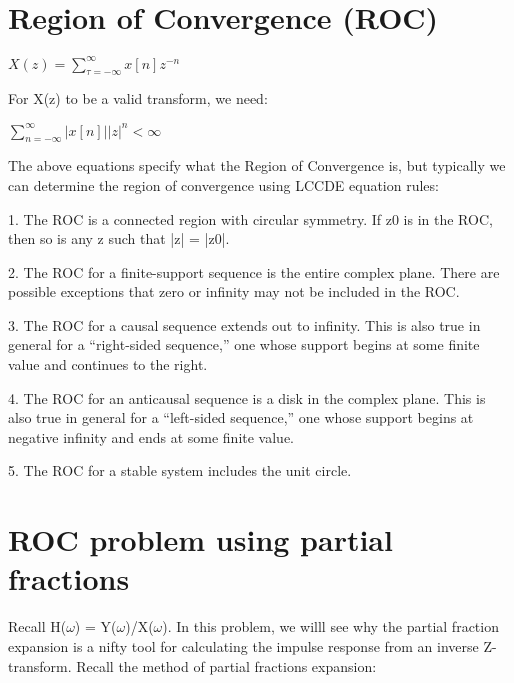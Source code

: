 \documentclass[11pt]{article}
\begin{document}
\vspace{3mm}

\section{Region of Convergence (ROC)}
\begin{center}
$
X(z) = \sum_{\tau  = -\infty}^{\infty} x[n] z^{-n}
$
\end{center}

\vspace{2mm}

For X(z) to be a valid transform, we need:
\vspace{2mm}
\begin{center}
$
\sum_{n = -\infty}^{\infty} |x[n]||z|^{n} < \infty
$
\end{center}

\vspace{2mm}

The above equations specify what the Region of Convergence is, but typically we can determine the region of convergence using LCCDE equation rules:\newline

\begin{center}

1. The ROC is a connected region with circular symmetry. If z0 is in the ROC,
then so is any z such that |z| = |z0|.

2. The ROC for a finite-support sequence is the entire complex plane. There
are possible exceptions that zero or infinity may not be included in the ROC.


3. The ROC for a causal sequence extends out to infinity. This is also true in
general for a “right-sided sequence,” one whose support begins at some finite
value and continues to the right.

4. The ROC for an anticausal sequence is a disk in the complex plane. This is
also true in general for a “left-sided sequence,” one whose support begins at
negative infinity and ends at some finite value.

5. The ROC for a stable system includes the unit circle.

\end{center}

\newpage
\section{ROC problem using partial fractions}

Recall H($\omega$) = Y($\omega$)/X($\omega$). In this problem, we willl see why the partial fraction expansion is a nifty tool for calculating the impulse response from an inverse Z-transform. Recall the method of partial fractions expansion:
\end{document}
